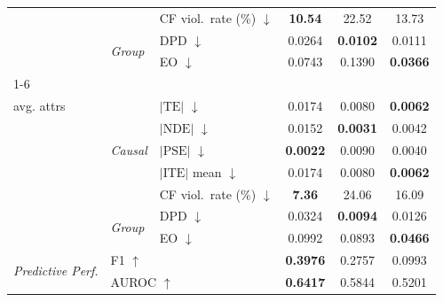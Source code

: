 \begin{table}[t]
\begin{tabular}{@{}lll ccc@{}}
  & & CF viol.\ rate (\%) $\downarrow$ & \textbf{10.54} & 22.52 & 13.73 \\
  & \multirow{2}{*}{\scriptsize\textit{Group}} & DPD $\downarrow$ & 0.0264 & \textbf{0.0102} & 0.0111 \\
  & & EO $\downarrow$ & 0.0743 & 0.1390 & \textbf{0.0366} \\
\cmidrule(lr){1-6}
  \multirow{7}{*}{\makecell[l]{\textit{Overall}\\[-2pt]\scriptsize avg. attrs}} & \multirow{5}{*}{\scriptsize\textit{Causal}} & $|\mathrm{TE}|$ $\downarrow$ & 0.0174 & 0.0080 & \textbf{0.0062} \\
  & & $|\mathrm{NDE}|$ $\downarrow$ & 0.0152 & \textbf{0.0031} & 0.0042 \\
  & & $|\mathrm{PSE}|$ $\downarrow$ & \textbf{0.0022} & 0.0090 & 0.0040 \\
  & & $|\mathrm{ITE}|$ mean $\downarrow$ & 0.0174 & 0.0080 & \textbf{0.0062} \\
  & & CF viol.\ rate (\%) $\downarrow$ & \textbf{7.36} & 24.06 & 16.09 \\
  & \multirow{2}{*}{\scriptsize\textit{Group}} & DPD $\downarrow$ & 0.0324 & \textbf{0.0094} & 0.0126 \\
  & & EO $\downarrow$ & 0.0992 & 0.0893 & \textbf{0.0466} \\
\midrule
\multirow{2}{*}{\textit{Predictive Perf.}} & \multicolumn{2}{l}{F1 $\uparrow$} & \textbf{0.3976} & 0.2757 & 0.0993 \\
  & \multicolumn{2}{l}{AUROC $\uparrow$} & \textbf{0.6417} & 0.5844 & 0.5201 \\
\bottomrule
\end{tabular}
\end{table}